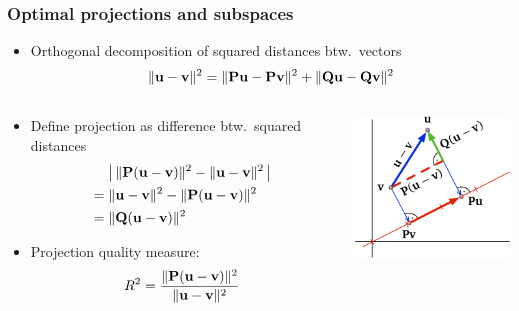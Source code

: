 \documentclass[t]{beamer} %
\begin{document}
\begin{frame}
  \frametitle{Optimal projections and subspaces}

  \begin{itemize}
  \item Orthogonal decomposition of squared distances btw.\ vectors
    \[
      \norm{\vu - \vv}^2 = \norm{\mathbf{P} \vu - \mathbf{P} \vv}^2 + \norm{\mathbf{Q} \vu - \mathbf{Q} \vv}^2
    \]
  \end{itemize}

  \begin{columns}[c]
    \begin{column}{60mm}
      \begin{itemize}
      \item<2-> Define projection  as difference btw.\ squared distances
        \begin{align*}
          & \bigabs{\,\norm{\mathbf{P}(\vu - \vv)}^2 - \norm{\vu - \vv}^2\,} \\
          =\;& \norm{\vu - \vv}^2 - \norm{\mathbf{P}(\vu - \vv)}^2 \\
          =\;& \norm{\mathbf{Q}(\vu - \vv)}^2
        \end{align*}
      \item<3-> Projection quality measure:
        \[
          R^2 = \frac{\norm{\mathbf{P}(\vu - \vv)}^2}{\norm{\vu - \vv}^2}
        \]
      \end{itemize}
    \end{column}
    \begin{column}{40mm}
      \hspace*{-5mm}%
      \includegraphics[width=45mm]{img/7_projection_loss}      
    \end{column}
  \end{columns}
\end{frame}


\end{document}
